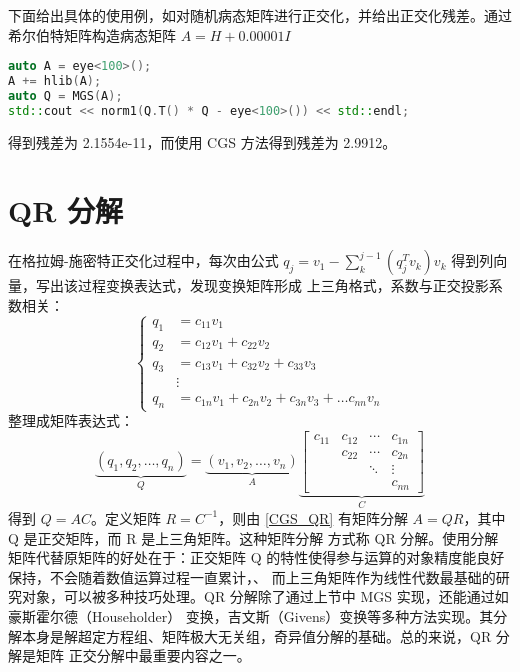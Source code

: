 下面给出具体的使用例，如对随机病态矩阵进行正交化，并给出正交化残差。通过希尔伯特矩阵构造病态矩阵 $A=H+0.00001I$
\begin{tcolorbox}
    \begin{center}
        \begin{minipage}{.92\linewidth}
            \begin{lstlisting}[language=C++]
auto A = eye<100>();
A += hlib(A);
auto Q = MGS(A);
std::cout << norm1(Q.T() * Q - eye<100>()) << std::endl;
\end{lstlisting}
        \end{minipage}
    \end{center}
\end{tcolorbox}
得到残差为 2.1554e-11，而使用 CGS 方法得到残差为 2.9912。

\section{QR 分解}

在格拉姆-施密特正交化过程中，每次由公式 $q_j=v_1-\sum_k^{j-1}(q_j^Tv_k)v_k$ 得到列向量，写出该过程变换表达式，发现变换矩阵形成
上三角格式，系数与正交投影系数相关：
\begin{equation}
    \begin{cases}
        q_1 & =c_{11}v_1                                     \\
        q_2 & =c_{12}v_1+c_{22}v_2                           \\
        q_3 & =c_{13}v_1+c_{32}v_2+c_{33}v_3                 \\
            & \vdots                                         \\
        q_n & =c_{1n}v_1+c_{2n}v_2+c_{3n}v_3+\dots c_{nn}v_n
    \end{cases}
\end{equation}
整理成矩阵表达式：
\begin{equation}
    \label{CGS_QR}
    \underbrace{\left(q_1,q_2,\dots,q_n\right)}_Q=\underbrace{\left(v_1,v_2,\dots,v_n\right)}_A
    \underbrace{
        \begin{bmatrix}
            c_{11} & c_{12} & \cdots & c_{1n} \\
                   & c_{22} & \cdots & c_{2n} \\
                   &        & \ddots & \vdots \\
                   &
                   &        & c_{nn}
        \end{bmatrix}
    }_C
\end{equation}
得到 $Q=AC$。定义矩阵 $R=C^{-1}$，则由 \eqref{CGS_QR} 有矩阵分解 $A=QR$，其中 Q 是正交矩阵，而 R 是上三角矩阵。这种矩阵分解
方式称 QR 分解。使用分解矩阵代替原矩阵的好处在于：正交矩阵 Q 的特性使得参与运算的对象精度能良好保持，不会随着数值运算过程一直累计，、
而上三角矩阵作为线性代数最基础的研究对象，可以被多种技巧处理。QR 分解除了通过上节中 MGS 实现，还能通过如豪斯霍尔德（Householder）
变换，吉文斯（Givens）变换等多种方法实现。其分解本身是解超定方程组、矩阵极大无关组，奇异值分解的基础。总的来说，QR 分解是矩阵
正交分解中最重要内容之一。

